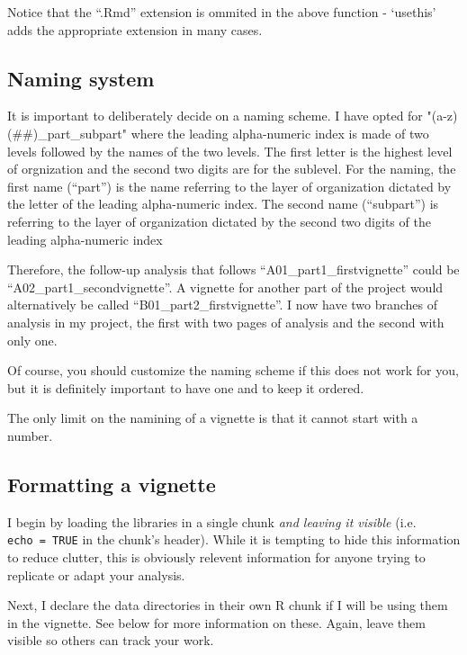 \documentclass[]{book}
\begin{document}
Notice that the ``.Rmd'' extension is ommited in the above function - `usethis' adds the appropriate extension in many cases.

\hypertarget{naming-system}{%
\subsection{Naming system}\label{naming-system}}

It is important to deliberately decide on a naming scheme. I have opted for "(a-z)(\#\#)\_part\_subpart" where the leading alpha-numeric index is made of two levels followed by the names of the two levels. The first letter is the highest level of orgnization and the second two digits are for the sublevel. For the naming, the first name (``part'') is the name referring to the layer of organization dictated by the letter of the leading alpha-numeric index. The second name (``subpart'') is referring to the layer of organization dictated by the second two digits of the leading alpha-numeric index

Therefore, the follow-up analysis that follows ``A01\_part1\_firstvignette'' could be ``A02\_part1\_secondvignette''. A vignette for another part of the project would alternatively be called ``B01\_part2\_firstvignette''. I now have two branches of analysis in my project, the first with two pages of analysis and the second with only one.

Of course, you should customize the naming scheme if this does not work for you, but it is definitely important to have one and to keep it ordered.

The only limit on the namining of a vignette is that it cannot start with a number.

\hypertarget{formatting-a-vignette}{%
\subsection{Formatting a vignette}\label{formatting-a-vignette}}

I begin by loading the libraries in a single chunk \emph{and leaving it visible} (i.e. \texttt{echo\ =\ TRUE} in the chunk's header). While it is tempting to hide this information to reduce clutter, this is obviously relevent information for anyone trying to replicate or adapt your analysis.

Next, I declare the data directories in their own R chunk if I will be using them in the vignette. See below for more information on these. Again, leave them visible so others can track your work.
\end{document}
